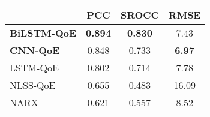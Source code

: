 \begin{tabular}{|l|c|c|c|}
  \hline
  & PCC & SROCC & RMSE\\
  \hline
  \textbf{BiLSTM-QoE} & \textbf{0.894} & \textbf{0.830} & 7.43\\
  \textbf{CNN-QoE} & 0.848 & 0.733 & \textbf{6.97} \\ \hline
  LSTM-QoE \citep{QoEModel_LSTM} & 0.802 & 0.714 & 7.78\\
  NLSS-QoE \citep{QoEModel_NLSS} & 0.655 & 0.483 & 16.09\\
  NARX \citep{QoEModel_NARX_DynamicNetworks} & 0.621 & 0.557 & 8.52\\ \hline
  
\end{tabular}
